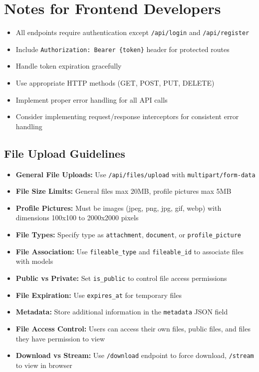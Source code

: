 \documentclass[12pt,a4paper]{article}
\begin{document}
\section{Notes for Frontend Developers}

\begin{itemize}
    \item All endpoints require authentication except \texttt{/api/login} and \texttt{/api/register}
    \item Include \texttt{Authorization: Bearer \{token\}} header for protected routes
    \item Handle token expiration gracefully
    \item Use appropriate HTTP methods (GET, POST, PUT, DELETE)
    \item Implement proper error handling for all API calls
    \item Consider implementing request/response interceptors for consistent error handling
\end{itemize}

\subsection{File Upload Guidelines}

\begin{itemize}
    \item \textbf{General File Uploads:} Use \texttt{/api/files/upload} with \texttt{multipart/form-data}
    \item \textbf{File Size Limits:} General files max 20MB, profile pictures max 5MB
    \item \textbf{Profile Pictures:} Must be images (jpeg, png, jpg, gif, webp) with dimensions 100x100 to 2000x2000 pixels
    \item \textbf{File Types:} Specify type as \texttt{attachment}, \texttt{document}, or \texttt{profile\_picture}
    \item \textbf{File Association:} Use \texttt{fileable\_type} and \texttt{fileable\_id} to associate files with models
    \item \textbf{Public vs Private:} Set \texttt{is\_public} to control file access permissions
    \item \textbf{File Expiration:} Use \texttt{expires\_at} for temporary files
    \item \textbf{Metadata:} Store additional information in the \texttt{metadata} JSON field
    \item \textbf{File Access Control:} Users can access their own files, public files, and files they have permission to view
    \item \textbf{Download vs Stream:} Use \texttt{/download} endpoint to force download, \texttt{/stream} to view in browser
\end{itemize}
\end{document}
